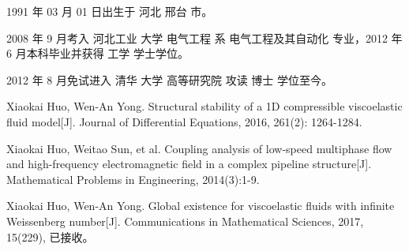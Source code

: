 \begin{resume}


  1991 年 03 月 01 日出生于 河北 邢台 市。

  2008 年 9 月考入 河北工业 大学  电气工程 系 电气工程及其自动化 专业，2012 年 6 月本科毕业并获得 工学 学士学位。

  2012 年 8 月免试进入 清华 大学 高等研究院 攻读 博士 学位至今。


  \begin{publications}
  \item Xiaokai Huo, Wen-An Yong. Structural stability of a 1D compressible viscoelastic fluid model[J]. Journal of Differential Equations, 2016, 261(2): 1264-1284.
  \item Xiaokai Huo, Weitao Sun, et al. Coupling analysis of low-speed multiphase flow and high-frequency electromagnetic field in a complex pipeline structure[J]. Mathematical Problems in Engineering, 2014(3):1-9.
  \item Xiaokai Huo, Wen-An Yong. Global existence for viscoelastic fluids with infinite Weissenberg number[J]. Communications in Mathematical Sciences, 2017, 15(229), 已接收。 
  \end{publications}

\end{resume}
